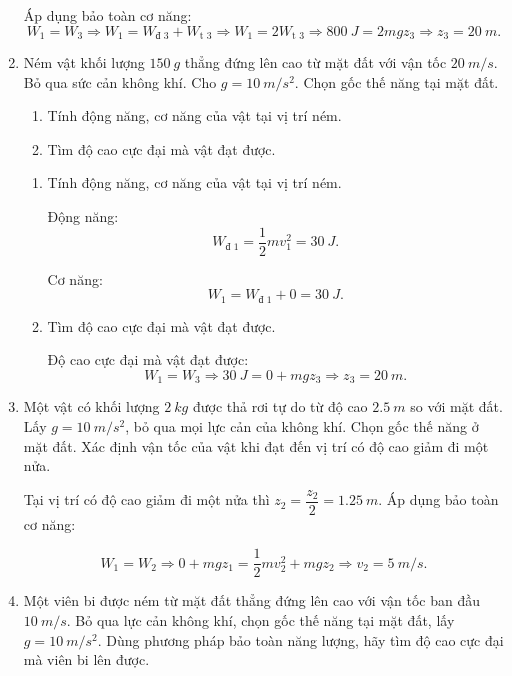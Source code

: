 \begin{enumerate}[label=\bfseries Câu \arabic*:]
{\begin{enumerate}[label=\alph*)]
			Áp dụng bảo toàn cơ năng:
			$$W_1 = W_3 \Rightarrow W_1 = W_\text{đ 3} + W_\text{t 3} \Rightarrow W_1 = 2 W_\text{t 3} \Rightarrow \SI{800}{J} = 2 mgz_3 \Rightarrow z_3 = \SI{20}{m}.$$
		\end{enumerate}
	}
		\item {}
	
	
	{
		Ném vật khối lượng $\SI{150}{g}$ thẳng đứng lên cao từ mặt đất với vận tốc $\SI{20}{m/s}$. Bỏ qua sức cản không khí. Cho $g=\SI{10}{m/s^2}$. Chọn gốc thế năng tại mặt đất.
		\begin{enumerate}[label=\alph*)]
			\item Tính động năng, cơ năng của vật tại vị trí ném.
			\item Tìm độ cao cực đại mà vật đạt được.
		\end{enumerate}
	}
	
	\hideall
	{	
		\begin{enumerate}[label=\alph*)]
			\item Tính động năng, cơ năng của vật tại vị trí ném.
			
			Động năng:
			$$W_\text{đ 1} = \dfrac{1}{2}mv_1^2 = \SI{30}{J}.$$
			
			Cơ năng:
			$$W_1 = W_\text{đ 1} + 0 = \SI{30}{J}.$$
			\item Tìm độ cao cực đại mà vật đạt được.
			
			Độ cao cực đại mà vật đạt được:
			$$W_1 = W_3 \Rightarrow \SI{30}{J} = 0 + mgz_3 \Rightarrow z_3 = \SI{20}{m}.$$
		\end{enumerate}
	}
		\item {}
	
	
	{
			Một vật có khối lượng $\SI{2}{kg}$ được thả rơi tự do từ độ cao $\SI{2.5}{m}$ so với mặt đất. Lấy $g=\SI{10}{m/s^2}$, bỏ qua mọi lực cản của không khí. Chọn gốc thế năng ở mặt đất. Xác định vận tốc của vật khi đạt đến vị trí có độ cao giảm đi một nửa.
	}
	
	\hideall
	{	
		Tại vị trí có độ cao giảm đi một nửa thì $z_2=\dfrac{z_2}{2} = \SI{1.25}{m}$. Áp dụng bảo toàn cơ năng:
		
		$$W_1 = W_2 \Rightarrow 0 + mgz_1 = \dfrac{1}{2}mv_2^2 + mgz_2 \Rightarrow v_2 = \SI{5}{m/s}.$$
	}
		\item {}
	
	
	{
			Một viên bi được ném từ mặt đất thẳng đứng lên cao với vận tốc ban đầu $\SI{10}{m/s}$. Bỏ qua lực cản không khí, chọn gốc thế năng tại mặt đất, lấy $g=\SI{10}{m/s^2}$. Dùng phương pháp bảo toàn năng lượng, hãy tìm độ cao cực đại mà viên bi lên được.
	}
	

\end{enumerate}
